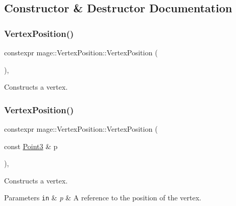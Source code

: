 \subsection{Constructor \& Destructor Documentation}
\hypertarget{structmage_1_1_vertex_position_a3d6367a3f555b5003e33132dfd77c1f0}{}\label{structmage_1_1_vertex_position_a3d6367a3f555b5003e33132dfd77c1f0} 
\subsubsection{\texorpdfstring{Vertex\+Position()}{VertexPosition()}\hspace{0.1cm}{\footnotesize\ttfamily [1/4]}}
{\footnotesize\ttfamily constexpr mage\+::\+Vertex\+Position\+::\+Vertex\+Position (\begin{DoxyParamCaption}{ }\end{DoxyParamCaption})\hspace{0.3cm}{\ttfamily [default]}, {\ttfamily [noexcept]}}

Constructs a vertex. \hypertarget{structmage_1_1_vertex_position_abee8a097ada3b0cbdec6c559f2393b0a}{}\label{structmage_1_1_vertex_position_abee8a097ada3b0cbdec6c559f2393b0a} 
\subsubsection{\texorpdfstring{Vertex\+Position()}{VertexPosition()}\hspace{0.1cm}{\footnotesize\ttfamily [2/4]}}
{\footnotesize\ttfamily constexpr mage\+::\+Vertex\+Position\+::\+Vertex\+Position (\begin{DoxyParamCaption}\item[{const \hyperlink{structmage_1_1_point3}{Point3} \&}]{p }\end{DoxyParamCaption})\hspace{0.3cm}{\ttfamily [explicit]}, {\ttfamily [noexcept]}}

Constructs a vertex.


\begin{DoxyParams}[1]{Parameters}
\mbox{\tt in}  & {\em p} & A reference to the position of the vertex. \\
\hline
\end{DoxyParams}
\hypertarget{structmage_1_1_vertex_position_a4f050c756f48e216f1bf540c8ec252aa}{}\label{structmage_1_1_vertex_position_a4f050c756f48e216f1bf540c8ec252aa} 
